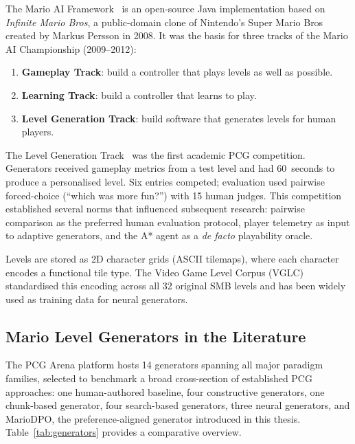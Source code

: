 \documentclass[shortabstract, mgr, english]{iithesis}
\begin{document}
The Mario AI Framework~\citep{karakovskiy2012marioai} is an open-source Java
implementation based on \emph{Infinite Mario Bros}, a public-domain clone of
Nintendo's Super Mario Bros created by Markus Persson in 2008. It was the
basis for three tracks of the Mario AI Championship (2009--2012):

\begin{enumerate}[nosep]
    \item \textbf{Gameplay Track}: build a controller that plays levels as well
          as possible.
    \item \textbf{Learning Track}: build a controller that learns to play.
    \item \textbf{Level Generation Track}: build software that generates levels
          for human players.
\end{enumerate}

The Level Generation Track~\citep{shaker2011mario} was the first academic PCG
competition. Generators received gameplay metrics from a test level and had
60~seconds to produce a personalised level. Six entries competed; evaluation used
pairwise forced-choice (``which was more fun?'') with 15 human judges. This
competition established several norms that influenced subsequent research:
pairwise comparison as the preferred human evaluation protocol, player telemetry
as input to adaptive generators, and the A* agent as a \emph{de facto}
playability oracle.

Levels are stored as 2D character grids (ASCII tilemaps), where each character
encodes a functional tile type. The Video Game Level Corpus
(VGLC)~\citep{summerville2016super} standardised this encoding across all 32
original SMB levels and has been widely used as training data for neural
generators.

\subsection{Mario Level Generators in the Literature}
\label{subsec:bg-mario-generators}

The PCG Arena platform hosts 14 generators spanning all major paradigm
families, selected to benchmark a broad cross-section of established PCG
approaches: one human-authored baseline, four constructive generators, one
chunk-based generator, four search-based generators, three neural generators,
and MarioDPO, the preference-aligned generator introduced in this thesis.
Table~\ref{tab:generators} provides a comparative overview.
\end{document}
